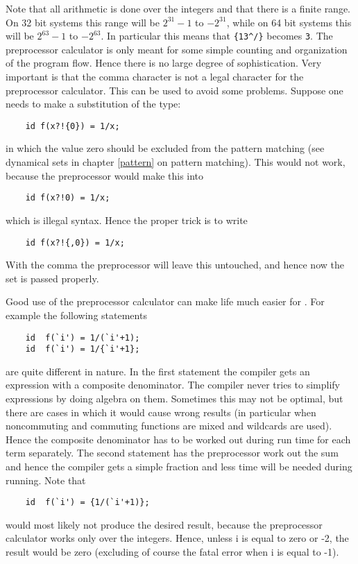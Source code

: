 Note that all arithmetic is done over the integers and 
that there is a finite range. On 32 bit systems this range 
will be $2^{31}-1$ to $-2^{31}$, while on 64 bit systems 
this will be  $2^{63}-1$ to $-2^{63}$. In particular this means that 
\verb:{13^/}: becomes \verb:3:. The preprocessor calculator is only meant 
for some simple counting and organization of the program flow. Hence there 
is no large degree of sophistication. Very important is that the 
comma character is not a legal character for the preprocessor 
calculator. This can be used to avoid some problems. Suppose one needs to 
make a substitution of the type:
\begin{verbatim}
    id f(x?!{0}) = 1/x;
\end{verbatim}
in which the value zero should be excluded from the pattern matching (see 
dynamical sets in chapter \ref{pattern} on pattern 
matching). This would not work, because the preprocessor would make this 
into
\begin{verbatim}
    id f(x?!0) = 1/x;
\end{verbatim}
which is illegal syntax. Hence the proper trick is to write
\begin{verbatim}
    id f(x?!{,0}) = 1/x;
\end{verbatim}
With the comma the preprocessor will leave this untouched, and hence now 
the set is passed properly.

Good use of the preprocessor calculator can make life much easier for 
\FORM\@. For example the following statements
\begin{verbatim}
    id  f(`i') = 1/(`i'+1);
    id  f(`i') = 1/{`i'+1};
\end{verbatim}
are quite different in nature. In the first statement the compiler gets an 
expression with a composite denominator. The compiler never tries to 
simplify expressions by doing algebra on them. Sometimes this may not be 
optimal, but there are cases in which it would cause wrong results (in 
particular when noncommuting and commuting functions are mixed and 
wildcards are used). Hence the composite denominator has to be worked out 
during run time for each term separately. The second statement has the 
preprocessor work out the sum and hence the compiler gets a simple fraction 
and less time will be needed during running. Note that
\begin{verbatim}
    id  f(`i') = {1/(`i'+1)};
\end{verbatim}
would most likely not produce the desired result, because the preprocessor 
calculator works only over the integers. Hence, unless i is equal to zero 
or -2, the result would be zero (excluding of course the fatal error when i 
is equal to -1).

